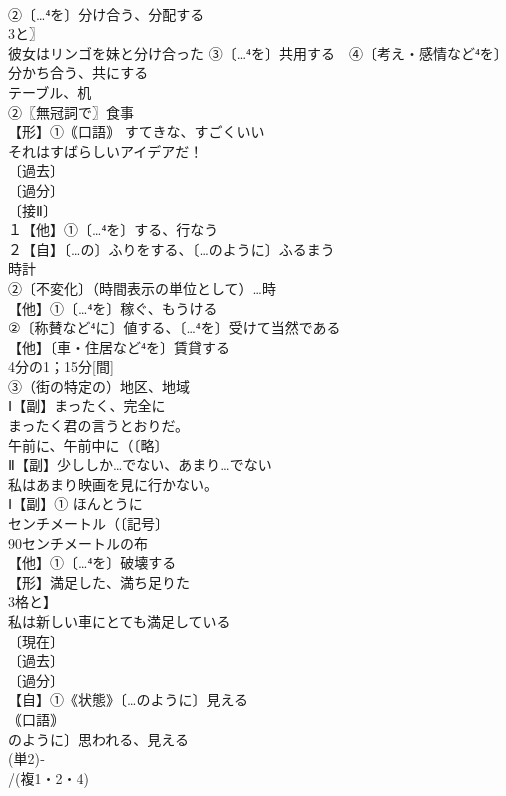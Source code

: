 \documentclass[8pt]{extreport}
\begin{document}
\begin{CJK}{UTF8}{min}
\\	②〔…⁴を〕分け合う、分配する 
\\	3と〗
\\	彼女はリンゴを妹と分け合った ③〔…⁴を〕共用する　④〔考え・感情など⁴を〕分かち合う、共にする
\\	テーブル、机
\\	②〖無冠詞で〗食事
\\	【形】①｟口語｠ すてきな、すごくいい
\\	それはすばらしいアイデアだ！
\\	〔過去〕
\\	〔過分〕
\\	〔接Ⅱ〕
\\	１【他】①〔…⁴を〕する、行なう 
\\	２【自】〔…の〕ふりをする、〔…のように〕ふるまう
\\	時計 
\\	②〔不変化〕（時間表示の単位として）…時
\\	【他】①〔…⁴を〕稼ぐ、もうける
\\	②〔称賛など⁴に〕値する、〔…⁴を〕受けて当然である
\\	【他】〔車・住居など⁴を〕賃貸する
\\	4分の1；15分[間]
\\	③（街の特定の）地区、地域
\\	Ⅰ【副】まったく、完全に 
\\	まったく君の言うとおりだ。
\\	午前に、午前中に（〔略〕
\\	Ⅱ【副】少ししか…でない、あまり…でない 
\\	私はあまり映画を見に行かない。
\\	Ⅰ【副】① ほんとうに 
\\	センチメートル（〔記号〕
\\	90センチメートルの布
\\	【他】①〔…⁴を〕破壊する
\\	【形】満足した、満ち足りた
\\	3格と】
\\	私は新しい車にとても満足している 
\\	〔現在〕
\\	〔過去〕
\\	〔過分〕
\\	【自】①《状態》〔…のように〕見える
\\	｟口語｠
\\	のように〕思われる、見える
\\	(単2)‐
\\	/(複1・2・4)

\end{CJK}
\end{document}
